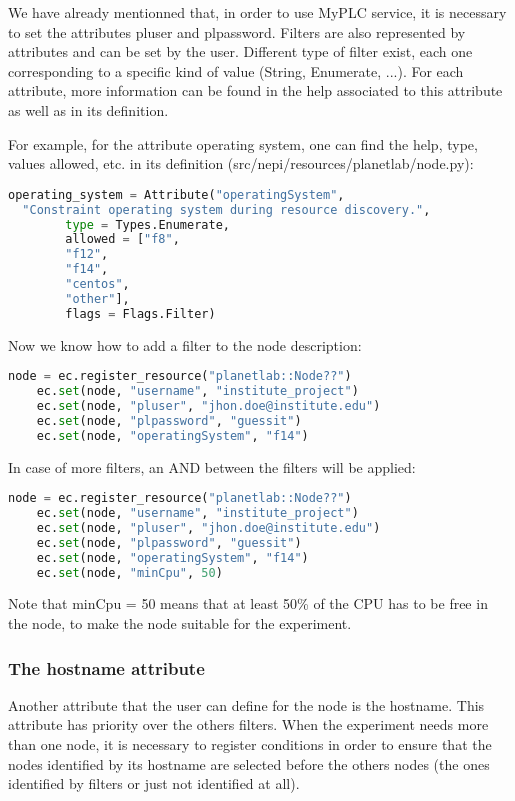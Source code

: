 We have already mentionned that, in order to use MyPLC service, it is necessary to set the attributes pluser and plpassword.  Filters are also represented by attributes and can be set by the user. Different type of filter exist, each one corresponding to a specific kind of value (String, Enumerate, ...). For each attribute, more information can be found in the help associated to this attribute as well as in its definition.

For example, for the attribute operating system, one can find the help, type, values allowed, etc. in its definition (src/nepi/resources/planetlab/node.py):
\begin{lstlisting}[language=Python]
operating_system = Attribute("operatingSystem", 
  "Constraint operating system during resource discovery.",
        type = Types.Enumerate,
        allowed = ["f8",
        "f12",
        "f14",
        "centos",
        "other"],
        flags = Flags.Filter)
\end{lstlisting}
Now we know how to add a filter to the node description:
\begin{lstlisting}[language=Python]
    node = ec.register_resource("planetlab::Node??")
    ec.set(node, "username", "institute_project")
    ec.set(node, "pluser", "​​jhon.doe@institute.edu")
    ec.set(node, "plpassword", "guessit")
    ec.set(node, "operatingSystem", "f14")
\end{lstlisting}
In case of more filters, an AND between the filters will be applied:

\begin{lstlisting}[language=Python]
    node = ec.register_resource("planetlab::Node??")
    ec.set(node, "username", "institute_project")
    ec.set(node, "pluser", "​​jhon.doe@institute.edu")
    ec.set(node, "plpassword", "guessit")
    ec.set(node, "operatingSystem", "f14")
    ec.set(node, "minCpu", 50)
\end{lstlisting}

Note that minCpu = 50 means that at least 50\% of the CPU has to be free in the node, to make the node suitable for the experiment.


\subsubsection{The hostname attribute}

Another attribute that the user can define for the node is the hostname. This attribute has priority over the others filters. When the experiment needs more than one node, it is necessary to register conditions in order to ensure that the nodes identified by its hostname are selected before the others nodes (the ones identified by filters or just not identified at all).

